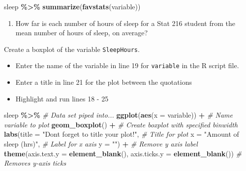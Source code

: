 \documentclass[
]{report}
\newenvironment{Shaded}{\begin{snugshade}}{\end{snugshade}}
\newcommand{\AttributeTok}[1]{\textcolor[rgb]{0.13,0.29,0.53}{#1}}
\newcommand{\CommentTok}[1]{\textcolor[rgb]{0.56,0.35,0.01}{\textit{#1}}}
\newcommand{\FunctionTok}[1]{\textcolor[rgb]{0.13,0.29,0.53}{\textbf{#1}}}
\newcommand{\NormalTok}[1]{#1}
\newcommand{\SpecialCharTok}[1]{\textcolor[rgb]{0.81,0.36,0.00}{\textbf{#1}}}
\newcommand{\StringTok}[1]{\textcolor[rgb]{0.31,0.60,0.02}{#1}}
\providecommand{\tightlist}{%
  \setlength{\itemsep}{0pt}\setlength{\parskip}{0pt}}
\begin{document}
\begin{Shaded}
\begin{Highlighting}[]
\NormalTok{sleep }\SpecialCharTok{\%\textgreater{}\%}
    \FunctionTok{summarize}\NormalTok{(}\FunctionTok{favstats}\NormalTok{(variable))}
\end{Highlighting}
\end{Shaded}

\begin{enumerate}
\def\labelenumi{\arabic{enumi}.}
\setcounter{enumi}{3}
\tightlist
\item
  How far is each number of hours of sleep for a Stat 216 student from the mean number of hours of sleep, on average?
\end{enumerate}

\vspace{0.3in}

Create a boxplot of the variable \texttt{SleepHours}.

\begin{itemize}
\item
  Enter the name of the variable in line 19 for \texttt{variable} in the R script file.
\item
  Enter a title in line 21 for the plot between the quotations
\item
  Highlight and run lines 18 - 25
\end{itemize}

\begin{Shaded}
\begin{Highlighting}[]
\NormalTok{sleep }\SpecialCharTok{\%\textgreater{}\%} \CommentTok{\# Data set piped into...}
    \FunctionTok{ggplot}\NormalTok{(}\FunctionTok{aes}\NormalTok{(}\AttributeTok{x =}\NormalTok{ variable)) }\SpecialCharTok{+}   \CommentTok{\# Name variable to plot}
    \FunctionTok{geom\_boxplot}\NormalTok{() }\SpecialCharTok{+}  \CommentTok{\# Create boxplot with specified binwidth}
    \FunctionTok{labs}\NormalTok{(}\AttributeTok{title =} \StringTok{"Don\textquotesingle{}t forget to title your plot!"}\NormalTok{, }\CommentTok{\# Title for plot}
       \AttributeTok{x =} \StringTok{"Amount of sleep (hrs)"}\NormalTok{, }\CommentTok{\# Label for x axis}
       \AttributeTok{y =} \StringTok{""}\NormalTok{) }\SpecialCharTok{+} \CommentTok{\# Remove y axis label}
    \FunctionTok{theme}\NormalTok{(}\AttributeTok{axis.text.y =} \FunctionTok{element\_blank}\NormalTok{(), }
          \AttributeTok{axis.ticks.y =} \FunctionTok{element\_blank}\NormalTok{()) }\CommentTok{\# Removes y{-}axis ticks}
\end{Highlighting}
\end{Shaded}
\end{document}
